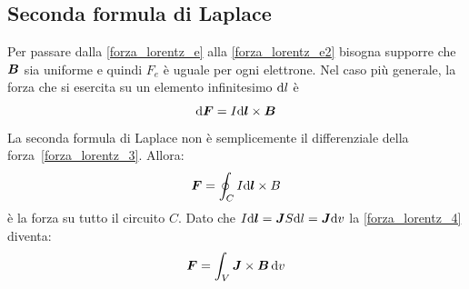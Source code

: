 \subsection{Seconda formula di Laplace}
Per passare dalla \eqref{forza_lorentz_e} alla \eqref{forza_lorentz_e2} bisogna supporre che $\boldsymbol{B}$ sia uniforme e quindi $F_e$ è uguale per ogni elettrone. Nel caso più generale, la forza che si esercita su un elemento infinitesimo $\mathrm{d} l$ è
\begin{equation}
  \mathrm{d} \boldsymbol{F}=I\mathrm{d} \boldsymbol{l}\times \boldsymbol{B}
\end{equation}
La seconda formula di Laplace non è semplicemente il differenziale della forza~\eqref{forza_lorentz_3}. Allora:
\begin{equation}
  \boldsymbol{F}=\oint_C I\mathrm{d}\boldsymbol{l}\times B
  \label{forza_lorentz_4}
\end{equation}
è la forza su tutto il circuito $C$. Dato che $I\mathrm{d} \boldsymbol{l}=\boldsymbol{J}S\mathrm{d} l=\boldsymbol{J}\mathrm{d} v$ la \eqref{forza_lorentz_4} diventa:
\begin{equation}
  \boldsymbol{F}=\int_V\boldsymbol{J}\times\boldsymbol{B}\,\mathrm{d} v
\end{equation}
